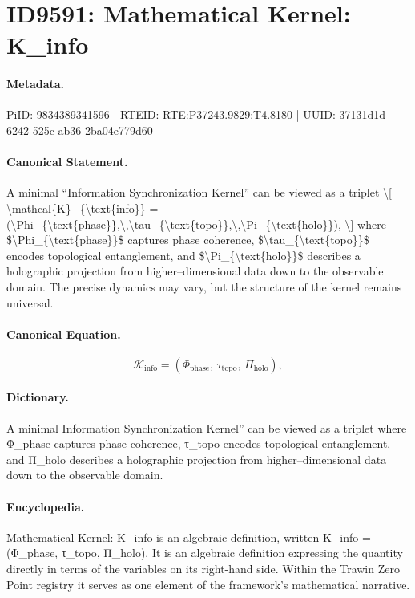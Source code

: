 \section*{ID9591: Mathematical Kernel: K\_info}
\paragraph{Metadata.}
PiID: 9834389341596 | RTEID: RTE:P37243.9829:T4.8180 | UUID: 37131d1d-6242-525c-ab36-2ba04e779d60

\paragraph{Canonical Statement.}
A minimal ``Information Synchronization Kernel'' can be viewed as a triplet \textbackslash{}[ \textbackslash{}mathcal\{K\}\_\{\textbackslash{}text\{info\}\} = (\textbackslash{}Phi\_\{\textbackslash{}text\{phase\}\},\textbackslash{},\textbackslash{}tau\_\{\textbackslash{}text\{topo\}\},\textbackslash{},\textbackslash{}Pi\_\{\textbackslash{}text\{holo\}\}), \textbackslash{}] where \$\textbackslash{}Phi\_\{\textbackslash{}text\{phase\}\}\$ captures phase coherence, \$\textbackslash{}tau\_\{\textbackslash{}text\{topo\}\}\$ encodes topological entanglement, and \$\textbackslash{}Pi\_\{\textbackslash{}text\{holo\}\}\$ describes a holographic projection from higher–dimensional data down to the observable domain. The precise dynamics may vary, but the structure of the kernel remains universal.

\paragraph{Canonical Equation.}
\[
\mathcal{K}_{\text{info}} = (\Phi_{\text{phase}},\,\tau_{\text{topo}},\,\Pi_{\text{holo}}),
\]

\paragraph{Dictionary.}
A minimal Information Synchronization Kernel'' can be viewed as a triplet where Φ\_phase captures phase coherence, τ\_topo encodes topological entanglement, and Π\_holo describes a holographic projection from higher–dimensional data down to the observable domain.

\paragraph{Encyclopedia.}
Mathematical Kernel: K\_info is an algebraic definition, written K\_info = (Φ\_phase, τ\_topo, Π\_holo). It is an algebraic definition expressing the quantity directly in terms of the variables on its right-hand side. Within the Trawin Zero Point registry it serves as one element of the framework's mathematical narrative.
